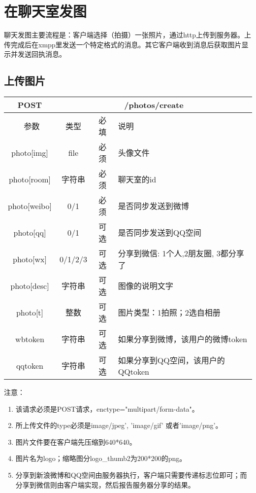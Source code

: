 
\section{在聊天室发图}
聊天发图主要流程是：客户端选择（拍摄）一张照片，通过http上传到服务器。上传完成后在xmpp里发送一个特定格式的消息。其它客户端收到消息后获取图片显示并发送回执消息。

\subsection{上传图片}

\begin{table}[H]
   \begin{center}
\begin{tabular}{|c|c|c|p{12cm}|}
\hline
POST & \multicolumn{3}{|c|}{/photos/create} \\
\hline\hline
 \  参数  & 类型 & 必填 &  说明  \\
\hline
 photo[img]  & file & 必须 &  头像文件\\
 \hline
 photo[room]  & 字符串 & 必须  &  聊天室的id\\
 \hline
 photo[weibo]  & 0/1 & 必须  &  是否同步发送到微博\\
  \hline
 photo[qq]  & 0/1 & 可选  &  是否同步发送到QQ空间\\
   \hline
 photo[wx]  & 0/1/2/3 & 可选  &  分享到微信: 1个人,2朋友圈, 3都分享了\\
   \hline
 photo[desc]  & 字符串 & 可选  &  图像的说明文字\\
 \hline
  photo[t]  & 整数 & 可选 &  图片类型：1拍照；2选自相册\\
 \hline
 wbtoken  & 字符串 & 可选  &  如果分享到微博，该用户的微博token\\
  \hline
 qqtoken  & 字符串 & 可选  &  如果分享到QQ空间，该用户的QQtoken\\
 \hline
\end{tabular}
   \end{center}
\end{table}

注意：

\begin{enumerate}
\item 该请求必须是POST请求，enctype="multipart/form-data"。
\item 所上传文件的type必须是image/jpeg', 'image/gif' 或者'image/png'。
\item 图片文件要在客户端先压缩到640*640。
\item 图片名为logo；缩略图分logo\_thumb2为200*200的png。
\item 分享到新浪微博和QQ空间由服务器执行，客户端只需要传递标志位即可；而分享到微信则由客户端实现，然后报告服务器分享的结果。
\end{enumerate}


